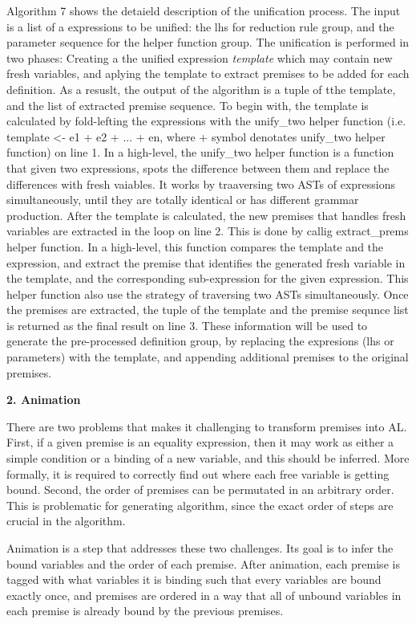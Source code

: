 Algorithm 7 shows the detaield description of the unification process.
The input is a list of a expressions to be unified: the lhs for reduction rule group, and the parameter
sequence for the helper function group.
The unification is performed in two phases: Creating a the unified expression \textit{template} which may
contain new fresh variables, and aplying the template to extract premises to be added for each definition.
As a resuslt, the output of the algorithm is a tuple of tthe template, and the list of extracted premise sequence.
To begin with, the template is calculated by fold-lefting the expressions
with the unify\_two helper function (i.e. template <- e1 + e2 + ... + en,
where + symbol denotates unify\_two helper function) on line 1.
In a high-level, the unify\_two helper function is a function that given two expressions,
spots the difference between them and replace the differences with fresh vaiables. It works by
traaversing two ASTs of expressions simultaneously, until they are totally identical or
has different grammar production.
After the template is calculated, the new premises that handles fresh variables are extracted
in the loop on line 2. This is done by callig extract\_prems helper function. In a high-level,
this function compares the template and the expression, and extract the premise that identifies the
generated fresh variable in the template, and the corresponding sub-expression for the given expression.
This helper function also use the strategy of traversing two ASTs simultaneously. Once the premises are
extracted, the tuple of the template and the premise sequnce list is returned as the final result on line 3.
These information will be used to generate the pre-processed definition group, by
replacing the expresions (lhs or parameters) with the template, and appending additional
premises to the original premises.


\textbf{2. Animation}

There are two problems that makes it challenging to transform premises into AL.
First, if a given premise is an equality expression, then it may work as either a simple condition or
a binding of a new variable, and this should be inferred. More formally, it is required to
correctly find out where each free variable is getting bound. Second, the order
of premises can be permutated in an arbitrary order. This is problematic for
generating algorithm, since the exact order of steps are crucial in the algorithm.

Animation is a step that addresses these two challenges. Its goal is to infer
the bound variables and the order of each premise.
After animation, each premise is tagged with what variables it is binding
such that every variables are bound exactly once, and premises are ordered in a way that
all of unbound variables in each premise is already bound by the previous premises.


